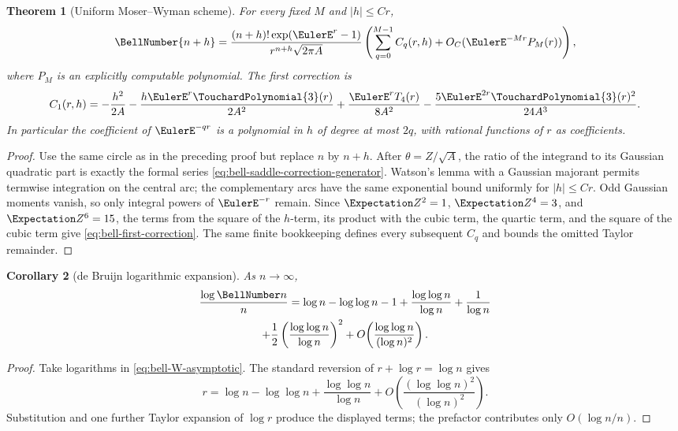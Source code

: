 \documentclass[11pt,a4paper,oneside,openany]{book}
\newtheorem{theorem}{Theorem}[chapter]
\newtheorem{corollary}[theorem]{Corollary}
\theoremstyle{definition}
\theoremstyle{remark}
\begin{document}
\begin{theorem}[Uniform Moser--Wyman scheme]\label{thm:bell-refined-saddle}
For every fixed $M$ and $|h|\le Cr$,
\begin{equation}\label{eq:bell-refined-saddle}
 \BellNumber{n+h}=\frac{(n+h)!\exp(\EulerE^r-1)}{r^{n+h}\sqrt{2\pi A}}
 \left(\sum_{q=0}^{M-1}C_q(r,h)+O_C(\EulerE^{-Mr}P_M(r))\right),
\end{equation}
where $P_M$ is an explicitly computable polynomial.  The first correction is
\begin{equation}\label{eq:bell-first-correction}
 C_1(r,h)=
 -\frac{h^2}{2A}-\frac{h \EulerE^r\TouchardPolynomial{3}(r)}{2A^2}
 +\frac{\EulerE^rT_4(r)}{8A^2}
 -\frac{5\EulerE^{2r}\TouchardPolynomial{3}(r)^2}{24A^3}.
\end{equation}
In particular the coefficient of $\EulerE^{-qr}$ is a polynomial in $h$ of degree at
most $2q$, with rational functions of $r$ as coefficients.
\end{theorem}
\begin{proof}
Use the same circle as in the preceding proof but replace $n$ by $n+h$.  After
$\theta=Z/\sqrt A$, the ratio of the integrand to its Gaussian quadratic part is
exactly the formal series \eqref{eq:bell-saddle-correction-generator}.  Watson's
lemma with a Gaussian majorant permits termwise integration on the central arc;
the complementary arcs have the same exponential bound uniformly for
$|h|\le Cr$.  Odd Gaussian moments vanish, so only integral powers of $\EulerE^{-r}$
remain.  Since $\Expectation Z^2=1$, $\Expectation Z^4=3$, and $\Expectation Z^6=15$, the terms from the square
of the $h$-term, its product with the cubic term, the quartic term, and the square
of the cubic term give \eqref{eq:bell-first-correction}.  The same finite
bookkeeping defines every subsequent $C_q$ and bounds the omitted Taylor
remainder.
\end{proof}

\begin{corollary}[de Bruijn logarithmic expansion]\label{cor:bell-debruijn}
As $n\to\infty$,
\begin{multline}\label{eq:bell-debruijn}
 \frac{\log\BellNumber n}{n}
 =\log n-\log\log n-1
 +\frac{\log\log n}{\log n}+\frac1{\log n}\\
 +\frac12\left(\frac{\log\log n}{\log n}\right)^2
 +O\!\left(\frac{\log\log n}{(\log n)^2}\right).
\end{multline}
\end{corollary}
\begin{proof}
Take logarithms in \eqref{eq:bell-W-asymptotic}.  The standard reversion of
$r+\log r=\log n$ gives
\[
 r=\log n-\log\log n+
\frac{\log\log n}{\log n}
 +O\!\left(\frac{(\log\log n)^2}{(\log n)^2}\right).
\]
Substitution and one further Taylor expansion of $\log r$ produce the displayed
terms; the prefactor contributes only $O(\log n/n)$.
\end{proof}
\end{document}
